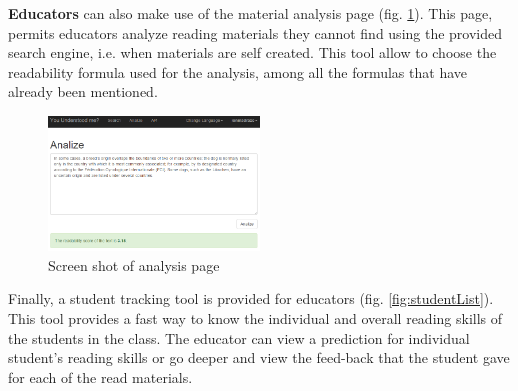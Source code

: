 \documentclass{sig-alternate-05-2015}
\begin{document}
\textbf{Educators} can also make use of the material analysis page (fig. \ref{fig:analysispage}). This page, permits educators analyze reading materials they cannot find using the provided search engine, i.e. when materials are self created. This tool allow to choose the readability formula used for the analysis, among all the formulas that have already been mentioned.

\begin{figure}[h!]
 \centering
  \includegraphics[width=0.5\textwidth]{AnaliseScreenShot2}
 \caption{Screen shot of analysis page}
 \label{fig:analysispage}
 \end{figure}
 
 
 
Finally, a student tracking tool is provided for educators (fig. \ref{fig:studentList}). This tool provides a fast way to know the individual and overall reading skills of the students in the  class. The educator can view a prediction for individual student's reading skills or go deeper and view the feed-back that the student gave for each of the read materials.




%





\end{document}
